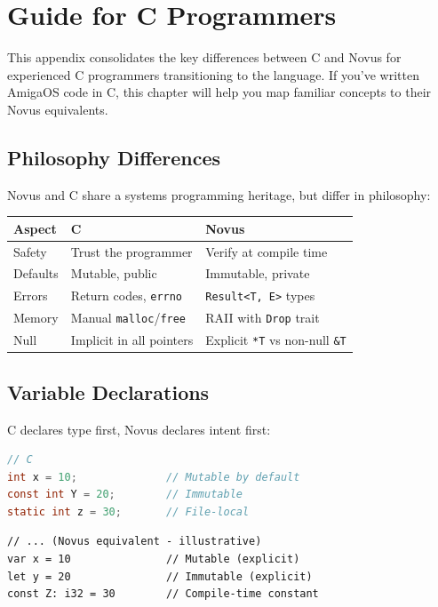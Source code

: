 \chapter{Guide for C Programmers}
\label{ch:c-programmers}

This appendix consolidates the key differences between C and Novus for experienced C programmers transitioning to the language. If you've written AmigaOS code in C, this chapter will help you map familiar concepts to their Novus equivalents.

\section{Philosophy Differences}

Novus and C share a systems programming heritage, but differ in philosophy:

\begin{center}
\begin{tabular}{lp{5.5cm}p{5.5cm}}
\textbf{Aspect} & \textbf{C} & \textbf{Novus} \\
\hline
Safety & Trust the programmer & Verify at compile time \\
Defaults & Mutable, public & Immutable, private \\
Errors & Return codes, \texttt{errno} & \texttt{Result<T, E>} types \\
Memory & Manual \texttt{malloc}/\texttt{free} & RAII with \texttt{Drop} trait \\
Null & Implicit in all pointers & Explicit \texttt{*T} vs non-null \texttt{\&T} \\
\end{tabular}
\end{center}

\section{Variable Declarations}

C declares type first, Novus declares intent first:

\begin{lstlisting}[language=C]
// C
int x = 10;              // Mutable by default
const int Y = 20;        // Immutable
static int z = 30;       // File-local
\end{lstlisting}

\begin{lstlisting}
// ... (Novus equivalent - illustrative)
var x = 10               // Mutable (explicit)
let y = 20               // Immutable (explicit)
const Z: i32 = 30        // Compile-time constant
\end{lstlisting}

